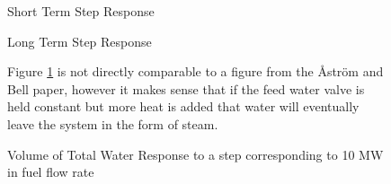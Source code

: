         \begin{figure}[ht]
            \begin{center}
                
                Short Term Step Response
                
                
                Long Term Step Response
                
                \caption{Volume of Total Water Response to a step corresponding to 10 MW in fuel flow rate}
                \label{fig:Valve_Open1C}
            \end{center}
            Figure \ref{fig:Valve_Open1C} is not directly comparable to a figure from the \r{A}str\"{o}m and Bell paper, however it makes sense that if the feed water valve is held constant but more heat is added that water will eventually leave the system in the form of steam. 
        \end{figure}  %
        
